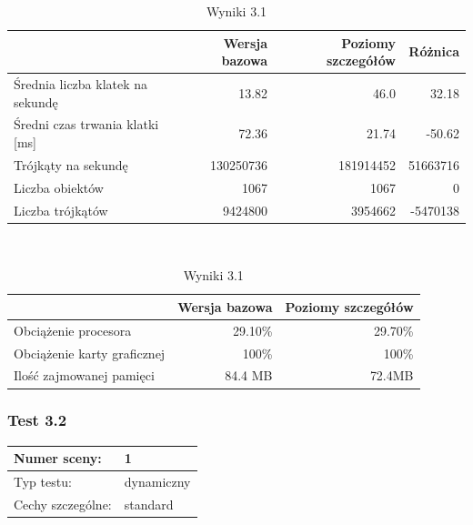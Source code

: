 \documentclass[a4paper,twoside,12pt]{book}
\begin{document}
\begin{table}[H]
    \centering
    \caption{Wyniki 3.1}
    \label{tab:lod_test1}
    \begin{tabular}{|l||r|r|r|}
        \hline
        & Wersja bazowa & Poziomy szczegółów & Różnica \\
        \hline
        Średnia liczba klatek na sekundę & 13.82 & 46.0 & 32.18 \\
        \hline
        Średni czas trwania klatki [ms] & 72.36 & 21.74 & -50.62 \\
        \hline
        Trójkąty na sekundę & 130250736 & 181914452 & 51663716 \\
        \hline
        Liczba obiektów & 1067 & 1067 & 0 \\
        \hline
        Liczba trójkątów & 9424800 & 3954662 & -5470138 \\
        \hline
    \end{tabular} \\
    
    \vspace*{0.5 cm}
    
    
    \begin{tabular}{|l||r|r|}
         \hline
        & Wersja bazowa & Poziomy szczegółów \\
         \hline
        Obciążenie procesora & 29.10\% & 29.70\% \\
        \hline
        Obciążenie karty graficznej & 100\% & 100\% \\
        \hline
        Ilość zajmowanej pamięci & 84.4 MB & 72.4MB \\
        \hline
    \end{tabular}
\end{table}

\subsubsection{Test 3.2}
\begin{tabular}{|l||l|}
\hline
Numer sceny: & 1 \\
\hline
Typ testu: & dynamiczny \\
\hline
Cechy szczególne: & standard \\
\hline
\end{tabular}\\
\end{document}
